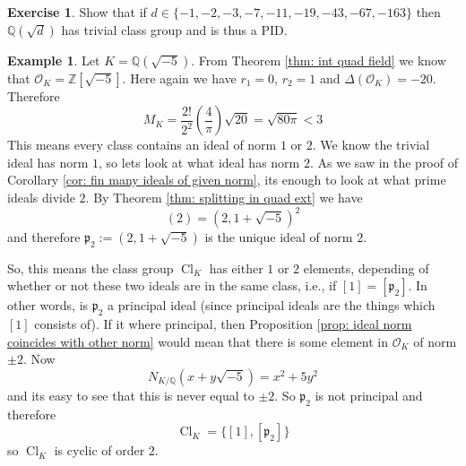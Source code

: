 \documentclass[11pt,a4paper]{report}
\theoremstyle{plain}
\theoremstyle{definition}
\newtheorem{exmp}[subsection]{Example}
\theoremstyle{definition}
\newtheorem{question}[subsection]{Exercise}
\newcommand{\ZZ}{\mathbb{Z}}
\def\QQ{\mathbb{Q}}
\def\gothp{\mathfrak{p}}
\def \OO {\mathcal{O}}
\DeclareMathOperator{\Cl}{Cl}
\begin{document}
	\begin{question}
		Show that if $d \in \{-1,-2,-3,-7,-11,-19,-43,-67,-163\}$ then $\QQ(\sqrt{d})$ has trivial class group and is thus a PID.
	\end{question}
	\begin{exmp}\label{exmp: class group -5}
		Let $K=\QQ(\sqrt{-5})$. From  Theorem \ref{thm: int quad field} we know that $\OO_K=\ZZ[\sqrt{-5}]$. Here again we have $r_1=0$, $r_2=1$ and $\Delta(\OO_K)=-20$. Therefore  \[M_K=\frac{2!}{2^2} \left(\frac{4}{\pi}\right)\sqrt{20}=\sqrt{80 \pi}< 3\]
		This means every class contains an ideal of norm $1$ or $2$. We know the trivial ideal has norm $1$, so lets look at what ideal has norm $2$. As we saw in the proof of Corollary \ref{cor: fin many ideals of given norm}, its enough to look at what prime ideals divide $2$. By Theorem \ref{thm: splitting in quad ext} we have \[(2)=(2,1+\sqrt{-5})^2\] and therefore $\gothp_2:=(2,1+\sqrt{-5})$ is the unique ideal of norm $2$. 
		
		So, this means the class group $\Cl_K$ has either $1$ or $2$ elements, depending of whether or not these two ideals are in the same class, i.e., if $[1]=[\gothp_2]$. In other words, is $\gothp_2$ a principal ideal (since principal ideals are the things which $[1]$ consists of). If it where principal, then Proposition \ref{prop: ideal norm coincides with other norm} would mean that there is some element in $\OO_K$ of norm $\pm 2$. Now \[N_{K/\QQ}(x+y\sqrt{-5})=x^2+5y^2\] and its easy to see that this is never equal to $\pm 2$. So $\gothp_2$ is not principal and therefore \[\Cl_K=\{[1],[\gothp_2]\}\] so $\Cl_K$ is cyclic of order $2$.	
	\end{exmp}
	
\end{document}
